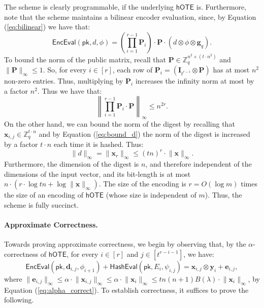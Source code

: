 \documentclass{article}
\newcommand{\BOTE}{\mathsf{hOTE}}
\newcommand{\Z}{\mathbb{Z}}
\renewcommand{\sec}{\ensuremath{\lambda}}
\newcommand{\algofont}[1]{\ensuremath{\mathsf{#1}}}
\newcommand{\Enc}{{\algofont{Enc}}}
\newcommand{\Eval}{\algofont{Eval}\xspace}
\newcommand{\Hash}{{\algofont{Hash}}}
\newcommand{\id}{\ensuremath{\mathbf{I}}}
\newcommand{\pk}{{\mathsf{pk}}}
\begin{document}
The scheme is clearly programmable, if the underlying $\BOTE$ is.
Furthermore, note that the scheme maintains a bilinear encoder evaluation, since, by Equation (\ref{eq:bilinear}) we have that:
\begin{equation}\label{eq:bilinear2}
    \Enc\Eval(\pk, d, \phi)=\left(\prod_{i=1}^{r-1}\mathbf{P}_i\right)\cdot \mathbf{P} \cdot (d\otimes \phi\otimes \mathbf{g}_q).
\end{equation}
To bound the norm of the public matrix, recall that  $\mathbf{P}\in\Z_q^{n^2\times (t\cdot n^2)}$ and $\lVert \mathbf{P}\rVert_\infty\le 1$. 
So, for every $i\in[r]$, each row of $\mathbf{P}_i=(\id_{t^{r-i}}\otimes \mathbf{P})$ has at most $n^2$ non-zero entries. Thus, multiplying by $\mathbf{P}_i$ increases the infinity norm at most by a factor $n^2$. Thus we have that:
\begin{equation}\label{eq:matrix_norm2}
    \left\lVert \prod_{i=1}^{r-1}\mathbf{P}_i \cdot \mathbf{P} \right\rVert_\infty \leq n^{2r}.
\end{equation}
On the other hand, we can bound the norm of the digest by recalling that $\mathbf{x}_{i,j}\in\Z_{q}^{t\cdot n}$ and by Equation (\ref{eq:bound_d}) the norm of the digest is increased by a factor $t\cdot n$ each time it is hashed. Thus:
\begin{equation}\label{eq:bound_d2}
    \lVert d\rVert_\infty = \lVert \mathbf{x}_r\rVert_\infty\leq (tn)^r\cdot \lVert \mathbf{x}\rVert_\infty.
\end{equation}
Furthermore, the dimension of the digest is $n$, and therefore independent of the dimensions of the input vector, and its bit-length is at most $n\cdot (r \cdot \log tn +\log  \lVert \mathbf{x}\rVert_\infty)$. The size of the encoding is $r=O(\log m)$ times the size of an encoding of $\BOTE$ (whose size is independent of $m$). Thus, the scheme is fully succinct.

\paragraph{Approximate Correctness.} Towards proving approximate correctness, we begin by observing that, by the $\alpha$-correctness of  $\BOTE$, for every $i\in[r]$ and $j\in[t^{r-i-1}]$, we have:
\begin{equation}\label{basic}
\Enc\Eval(\pk, \mathbf{d}_{i,j}, \phi_{i+1})+\Hash\Eval(\pk, E_i, \psi_{i,j})=\mathbf{x}_{i,j}\otimes \mathbf{y}_i+\mathbf{e}_{i,j},
\end{equation}
where $\lVert \mathbf{e}_{i,j}\rVert_\infty\le \alpha\cdot \lVert \mathbf{x}_{i,j}\rVert_\infty \le \alpha\cdot \lVert \mathbf{x}_i\rVert_\infty \leq tn(n+1) B(\sec)\cdot \lVert \mathbf{x}_i\rVert_\infty$, by Equation (\ref{eq:alpha_correct}). To establish correctness, it suffices to prove the following.
\end{document}
